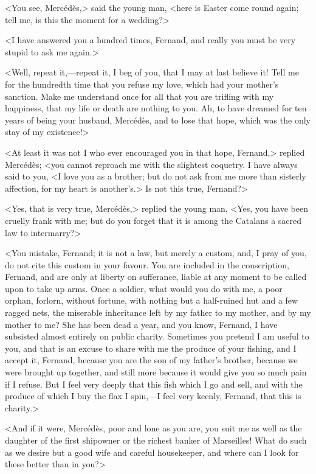  <You see, Mercédès,> said the young man, <here is Easter come round again; tell me, is this the moment for a wedding?> 

 <I have answered you a hundred times, Fernand, and really you must be very stupid to ask me again.> 

 <Well, repeat it,—repeat it, I beg of you, that I may at last believe it! Tell me for the hundredth time that you refuse my love, which had your mother's sanction. Make me understand once for all that you are trifling with my happiness, that my life or death are nothing to you. Ah, to have dreamed for ten years of being your husband, Mercédès, and to lose that hope, which was the only stay of my existence!> 

 <At least it was not I who ever encouraged you in that hope, Fernand,> replied Mercédès; <you cannot reproach me with the slightest coquetry. I have always said to you, <I love you as a brother; but do not ask from me more than sisterly affection, for my heart is another's.> Is not this true, Fernand?> 

 <Yes, that is very true, Mercédès,> replied the young man, <Yes, you have been cruelly frank with me; but do you forget that it is among the Catalans a sacred law to intermarry?>  
 
 <You mistake, Fernand; it is not a law, but merely a custom, and, I pray of you, do not cite this custom in your favour. You are included in the conscription, Fernand, and are only at liberty on sufferance, liable at any moment to be called upon to take up arms. Once a soldier, what would you do with me, a poor orphan, forlorn, without fortune, with nothing but a half-ruined hut and a few ragged nets, the miserable inheritance left by my father to my mother, and by my mother to me? She has been dead a year, and you know, Fernand, I have subsisted almost entirely on public charity. Sometimes you pretend I am useful to you, and that is an excuse to share with me the produce of your fishing, and I accept it, Fernand, because you are the son of my father's brother, because we were brought up together, and still more because it would give you so much pain if I refuse. But I feel very deeply that this fish which I go and sell, and with the produce of which I buy the flax I spin,—I feel very keenly, Fernand, that this is charity.> 

 <And if it were, Mercédès, poor and lone as you are, you suit me as well as the daughter of the first shipowner or the richest banker of Marseilles! What do such as we desire but a good wife and careful housekeeper, and where can I look for these better than in you?> 

